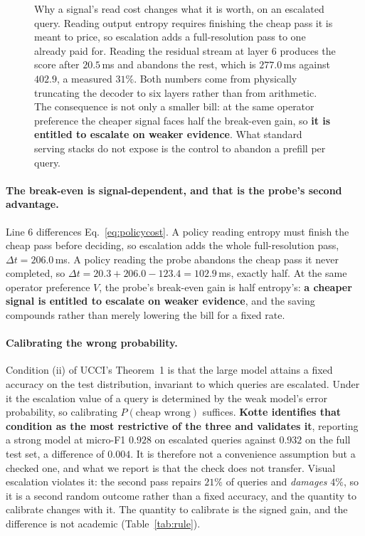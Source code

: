 \documentclass[10pt,twocolumn]{article}
\theoremstyle{plain}
\begin{document}
\begin{figure}[t]
\caption{Why a signal's read cost changes what it is worth, on an escalated
query. Reading output entropy requires finishing the cheap pass it is meant to
price, so escalation adds a full-resolution pass to one already paid for.
Reading the residual stream at layer $6$ produces the score after $20.5$\,ms
and abandons the rest, which is $277.0$\,ms against $402.9$, a measured $31\%$.
Both numbers come from physically truncating the decoder to six layers rather
than from arithmetic. The consequence is not only a smaller bill: at the same
operator preference the cheaper signal faces half the break-even gain, so
\textbf{it is entitled to escalate on weaker evidence}. What standard serving
stacks do not expose is the control to abandon a prefill per query.}
\label{fig:prefill}
\end{figure}


\paragraph{The break-even is signal-dependent, and that is the probe's second
advantage.} Line 6 differences Eq.~\ref{eq:policycost}. A policy reading entropy
must finish the cheap pass before deciding, so escalation adds the whole
full-resolution pass, $\Delta t = 206.0$\,ms. A policy reading the probe
abandons the cheap pass it never completed, so $\Delta t = 20.3 + 206.0 - 123.4
= 102.9$\,ms, exactly half. At the same operator preference $V$, the probe's
break-even gain is half entropy's: \textbf{a cheaper signal is entitled to
escalate on weaker evidence}, and the saving compounds rather than merely
lowering the bill for a fixed rate.

\paragraph{Calibrating the wrong probability.} Condition (ii) of UCCI's
Theorem~1 is that the large model attains a fixed accuracy on the test
distribution, invariant to which queries are escalated. Under it the escalation
value of a query is determined by the weak model's error probability, so
calibrating $P(\text{cheap wrong})$ suffices. \textbf{Kotte identifies that
condition as the most restrictive of the three and validates it}, reporting a
strong model at micro-F1 $0.928$ on escalated queries against $0.932$ on the
full test set, a difference of $0.004$. It is therefore not a convenience
assumption but a checked one, and what we report is that the check does not
transfer. Visual escalation violates it: the second pass repairs $21\%$ of
queries and \emph{damages} $4\%$, so it is a second random outcome rather than a
fixed accuracy, and the quantity to calibrate changes with it. The quantity to calibrate is the
signed gain, and the difference is not academic (Table~\ref{tab:rule}).
\end{document}
